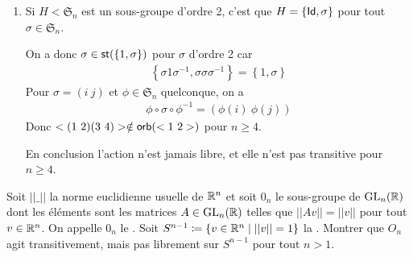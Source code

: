 \documentclass[french,a4paper,10pt]{article}
\begin{document}
\begin{td-sol}
\begin{enumerate}[label=$(\roman*)$]
\begin{rappel}
					\[\begin{aligned}
						\scr D_n&\to\mathfrak{S}_{\mu_n}\\
						R^j&\mapsto\left[\zeta^k\mapsto e^{\frac{2j\pi i}n}\zeta^k\right]\\
						R^jS&\mapsto\left[\zeta^k\mapsto e^{\frac{2j\pi i}n}\zeta^{-k}\right]
					\end{aligned}\]
				\end{rappel}
			
			L'action de $\scr D_n$ sur $\mu_n$ n'est pas libre car $S\in\st(1)$ et donc $S\cdot 1=\ol 1=1$.
			
			L'action est transitive car $\zeta^k=R^k\cdot 1\quad\forall \zeta^k\in\mu_n$.
			
			\item Si $H<\mathfrak{S}_n$ est un sous-groupe d'ordre 2, c'est que $H=\{\operatorname{\mathsf{Id}}, \sigma\}$ pour tout $\sigma\in \mathfrak{S}_n$.
			
			On a donc $\sigma\in\operatorname{\mathsf{st}}(\{1, \sigma\})$ pour $\sigma$ d'ordre 2 car
				\[\begin{aligned}
					\left\{\sigma 1\sigma^{-1},\sigma\sigma\sigma^{-1}\right\}=\left\{1, \sigma\right\}
				\end{aligned}\]
			Pour $\sigma = (i~j)$ et $\phi\in\mathfrak{S}_n$ quelconque, on a
				\[\begin{aligned}
					\phi\circ\sigma\circ\phi^{-1}=\left(\phi(i)~\phi(j)\right)
				\end{aligned}\]
			Donc $<(1~2)(3~4)>\notin\operatorname{\mathsf{orb}}(<1~2>)$ pour $n\ge 4$.
			
			En conclusion l'action n'est jamais libre, et elle n'est pas transitive pour $n\ge 4$.
		\end{enumerate}
	\end{td-sol}
	\medspace
	\begin{td-exo}
	Soit $||\_||$ la norme euclidienne usuelle de $\mathbb{R}^n$ et soit $0_n$ le sous-groupe de $\text{GL}_{n}(\mathbb{R})$ dont les éléments sont les matrices $A\in\text{GL}_{n}(\mathbb{R})$ telles que $||Av||=||v||$ pour tout $v\in\mathbb{R}^n$. On appelle $0_n$ le . Soit $S^{n-1}\coloneq \{v\in \mathbb{R}^n\mid||v||=1\}$ la . Montrer que $O_n$ agit transitivement, mais pas librement sur $S^{n-1}$ pour tout $n>1$.
	\end{td-exo}
	
	
\end{document}

